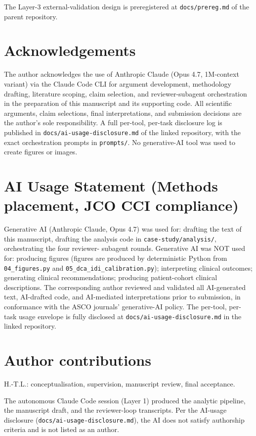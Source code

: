 \documentclass[12pt]{article}
\begin{document}
The Layer-3 external-validation design is preregistered at
\texttt{docs/prereg.md} of the parent repository.

\section*{Acknowledgements}

The author acknowledges the use of Anthropic Claude (Opus 4.7,
1M-context variant) via the Claude Code CLI for argument development,
methodology drafting, literature scoping, claim selection, and
reviewer-subagent orchestration in the preparation of this manuscript
and its supporting code. All scientific arguments, claim selections,
final interpretations, and submission decisions are the author's sole
responsibility. A full per-tool, per-task disclosure log is published
in \texttt{docs/ai-usage-disclosure.md} of the linked repository,
with the exact orchestration prompts in \texttt{prompts/}. No
generative-AI tool was used to create figures or images.

\section*{AI Usage Statement (Methods placement, JCO CCI compliance)}

Generative AI (Anthropic Claude, Opus 4.7) was used for: drafting the
text of this manuscript, drafting the analysis code in
\texttt{case-study/analysis/}, orchestrating the four reviewer-
subagent rounds. Generative AI was NOT used for: producing figures
(figures are produced by deterministic Python from
\texttt{04\_figures.py} and \texttt{05\_dca\_idi\_calibration.py});
interpreting clinical outcomes; generating clinical recommendations;
producing patient-cohort clinical descriptions. The corresponding
author reviewed and validated all AI-generated text, AI-drafted code,
and AI-mediated interpretations prior to submission, in conformance
with the ASCO journals' generative-AI policy. The per-tool, per-task
usage envelope is fully disclosed at
\texttt{docs/ai-usage-disclosure.md} in the linked repository.

\section*{Author contributions}

H.-T.L.: conceptualisation, supervision, manuscript review, final
acceptance.

The autonomous Claude Code session (Layer 1) produced the analytic
pipeline, the manuscript draft, and the reviewer-loop transcripts.
Per the AI-usage disclosure
(\texttt{docs/ai-usage-disclosure.md}), the AI does not satisfy
authorship criteria and is not listed as an author.
\end{document}
